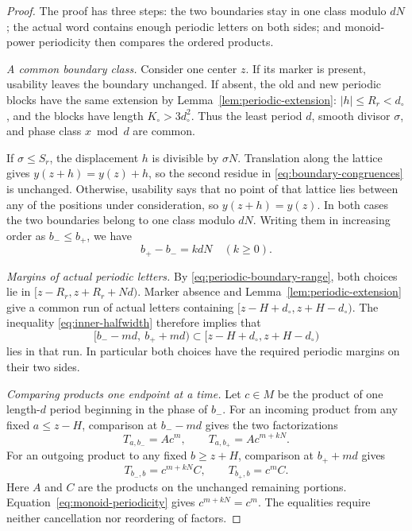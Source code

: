 \begin{proof}
The proof has three steps: the two boundaries stay in one class modulo
$dN$; the actual word contains enough periodic letters on both sides;
and monoid-power periodicity then compares the ordered products.

\emph{A common boundary class.}
Consider one center $z$. If its marker is present, usability leaves
the boundary unchanged.  If absent, the old and new periodic blocks
have the same extension by Lemma~\ref{lem:periodic-extension}:
$|h|\leq R_r<d_\circ$, and the blocks have length $K_\circ>3d_\circ^2$.
Thus the least period $d$, smooth divisor $\sigma$, and phase class
$x\bmod d$ are common.

If $\sigma\leq S_r$, the displacement $h$ is divisible by $\sigma N$.
Translation along the lattice gives $y(z+h)=y(z)+h$, so the second
residue in \eqref{eq:boundary-congruences} is unchanged.  Otherwise,
usability says that no point of that lattice lies between any of the
positions under consideration, so $y(z+h)=y(z)$.  In both cases the
two boundaries belong to one class modulo $dN$.  Writing them in
increasing order as $b_-\leq b_+$, we have
\begin{equation}\label{eq:boundary-displacement}
                            b_+-b_-=kdN\quad(k\geq0).
\end{equation}

\emph{Margins of actual periodic letters.}
By \eqref{eq:periodic-boundary-range}, both choices lie in
$[z-R_r,z+R_r+Nd)$.  Marker absence and
Lemma~\ref{lem:periodic-extension} give a common run of actual letters
containing $[z-H+d_\circ,z+H-d_\circ)$.  The inequality
\eqref{eq:inner-halfwidth} therefore implies that
\begin{equation}\label{eq:periodic-margins}
               [b_--md,\ b_++md)
                 \subset [z-H+d_\circ,z+H-d_\circ)
\end{equation}
lies in that run.  In particular both choices have the required
periodic margins on their two sides.

\emph{Comparing products one endpoint at a time.}
Let $c\in M$ be the product of one length-$d$ period beginning in
the phase of $b_-$.  For an incoming product from any fixed
$a\leq z-H$, comparison at $b_--md$ gives the two factorizations
\[
             T_{a,b_-}=A c^m,\qquad
             T_{a,b_+}=A c^{m+kN}.
\]
For an outgoing product to any fixed $b\geq z+H$, comparison at
$b_++md$ gives
\[
             T_{b_-,b}=c^{m+kN}C,\qquad
             T_{b_+,b}=c^m C.
\]
Here $A$ and $C$ are the products on the unchanged remaining portions.
Equation~\eqref{eq:monoid-periodicity} gives
$c^{m+kN}=c^m$.  The equalities require neither cancellation nor
reordering of factors.


\end{proof}
